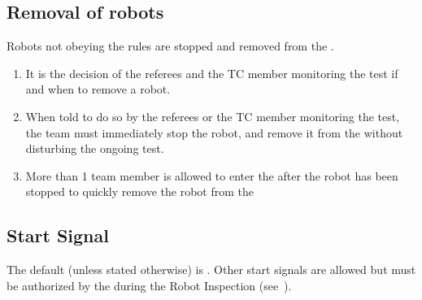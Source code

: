 \subsection{Removal of robots}
\label{rule:robot_removal}
Robots not obeying the rules are stopped and removed from the \Arena{}.
\begin{enumerate}
	\item It is the decision of the referees and the TC member monitoring the test if and when to remove a robot.

	\item When told to do so by the referees or the TC member monitoring the test, the team must immediately stop the robot, and remove it from the \Arena{} without disturbing the ongoing test.
	
	\item More than 1 team member is allowed to enter the \Arena{} after the robot has been stopped to quickly remove the robot from the \Arena{}

\end{enumerate}


\subsection{Start Signal}\label{rule:start_signal}
The default  (unless stated otherwise) is .
Other start signals are allowed but must be authorized by the  during the Robot Inspection (see~).

